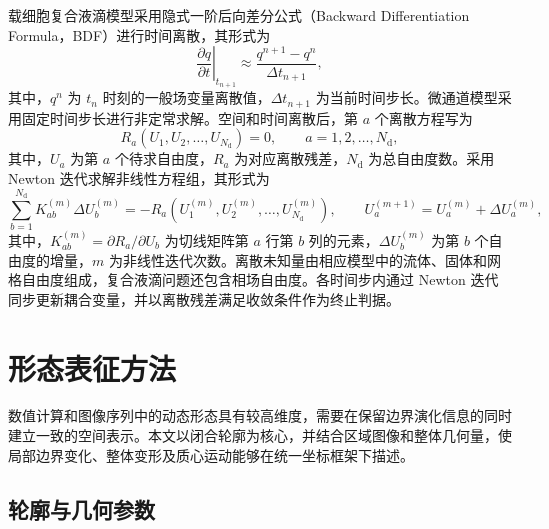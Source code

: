 载细胞复合液滴模型采用隐式一阶后向差分公式（Backward Differentiation Formula，BDF）进行时间离散\cite{ascher1998computer}，其形式为
\begin{equation}
\left.
\frac{\partial q}{\partial t}
\right|_{t_{n+1}}
\approx
\frac{q^{n+1}-q^n}{\Delta t_{n+1}},
\label{eq:ch2_bdf_first_order}
\end{equation}
其中，$q^n$ 为 $t_n$ 时刻的一般场变量离散值，$\Delta t_{n+1}$ 为当前时间步长。微通道模型采用固定时间步长进行非定常求解。空间和时间离散后，第 $a$ 个离散方程写为
\begin{equation}
R_a\left(U_1,U_2,\ldots,U_{N_{\mathrm d}}\right)
=0,
\qquad a=1,2,\ldots,N_{\mathrm d},
\label{eq:ch2_discrete_residual}
\end{equation}
其中，$U_a$ 为第 $a$ 个待求自由度，$R_a$ 为对应离散残差，$N_{\mathrm d}$ 为总自由度数。采用 Newton 迭代求解非线性方程组\cite{ypma1995historical}，其形式为
\begin{equation}
\sum_{b=1}^{N_{\mathrm d}}
K_{ab}^{(m)}
\Delta U_b^{(m)}
=
-R_a\left(U_1^{(m)},U_2^{(m)},\ldots,U_{N_{\mathrm d}}^{(m)}\right),
\qquad
U_a^{(m+1)}
=
U_a^{(m)}
+
\Delta U_a^{(m)},
\label{eq:ch2_newton_iteration}
\end{equation}
其中，$K_{ab}^{(m)}=\partial R_a/\partial U_b$ 为切线矩阵第 $a$ 行第 $b$ 列的元素，$\Delta U_b^{(m)}$ 为第 $b$ 个自由度的增量，$m$ 为非线性迭代次数。离散未知量由相应模型中的流体、固体和网格自由度组成，复合液滴问题还包含相场自由度。各时间步内通过 Newton 迭代同步更新耦合变量，并以离散残差满足收敛条件作为终止判据。

\section{形态表征方法}
\label{sec:ch2_morphology}

数值计算和图像序列中的动态形态具有较高维度，需要在保留边界演化信息的同时建立一致的空间表示。本文以闭合轮廓为核心，并结合区域图像和整体几何量，使局部边界变化、整体变形及质心运动能够在统一坐标框架下描述。

\subsection{轮廓与几何参数}
\label{subsec:ch2_geometry}

